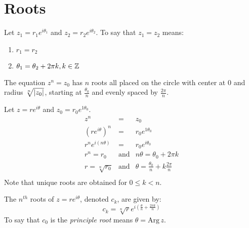 \documentclass[letterpaper,12pt,fleqn]{article}
\renewcommand{\o}{\theta}
\newcommand{\Arg}[1]{\mathrm{Arg}\,#1}
\begin{document}
\section*{Roots}
\begin{definition}
Let $z_1=r_1e^{i\o_1}$ and $z_2=r_2e^{i\o_2}$. To say that $z_1=z_2$ means:
\begin{enumerate}
\item $r_1=r_2$
\item $\o_1=\o_2+2\pi k, k\in\Z$
\end{enumerate}
\end{definition}

\begin{theorem}
The equation $z^n=z_0$ has $n$ roots all placed on the circle with center at $0$
and radius $\sqrt[n]{\lvert z_0\rvert}$, starting at $\frac{\o_0}{n}$ and evenly spaced
by $\frac{2\pi}{n}$.
\end{theorem}

\begin{theproof}
Let $z=re^{i\o}$ and $z_0=r_0e^{1\o_0}$.
\begin{eqnarray*}
z^n &=& z_0 \\
\left(re^{i\o}\right)^n &=& r_0e^{1\o_0} \\
r^ne^{i(n\o)} &=& r_0e^{i\o_0} \\
r^n=r_0 &\mbox{and}& n\o=\o_0+2\pi k \\
r=\sqrt[n]{r_0} &\mbox{and}& \o=\frac{\o_0}{n}+k\frac{2\pi}{n} \\
\end{eqnarray*}
Note that unique roots are obtained for $0\le k<n$.
\end{theproof}

\begin{definition}
The $n^{th}$ roots of $z=re^{i\o}$, denoted $c_k$, are given by:
\[c_k=\sqrt[n]{r}e^{i(\frac{\o}{n}+\frac{2\pi k}{n})}\]
To say that $c_0$ is the \emph{principle root} means $\o=\Arg{z}$.
\end{definition}
\end{document}
